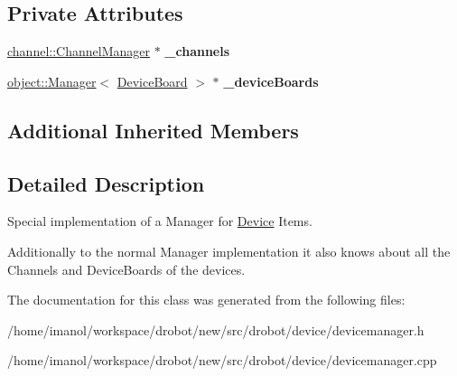 \subsection*{Private Attributes}
\begin{DoxyCompactItemize}
\item 
\hypertarget{classdrobot_1_1device_1_1DeviceManager_ae348bc4e97657d6a2222a61553e4327c}{\hyperlink{classdrobot_1_1device_1_1channel_1_1ChannelManager}{channel\-::\-Channel\-Manager} $\ast$ {\bfseries \-\_\-channels}}\label{classdrobot_1_1device_1_1DeviceManager_ae348bc4e97657d6a2222a61553e4327c}

\item 
\hypertarget{classdrobot_1_1device_1_1DeviceManager_abc4c2b56c5ae9aa5e0a906bc288b87b6}{\hyperlink{classdrobot_1_1object_1_1Manager}{object\-::\-Manager}$<$ \hyperlink{classdrobot_1_1device_1_1DeviceBoard}{Device\-Board} $>$ $\ast$ {\bfseries \-\_\-device\-Boards}}\label{classdrobot_1_1device_1_1DeviceManager_abc4c2b56c5ae9aa5e0a906bc288b87b6}

\end{DoxyCompactItemize}
\subsection*{Additional Inherited Members}


\subsection{Detailed Description}
Special implementation of a Manager for \hyperlink{classdrobot_1_1device_1_1Device}{Device} Items. 

Additionally to the normal Manager implementation it also knows about all the Channels and Device\-Boards of the devices. 

The documentation for this class was generated from the following files\-:\begin{DoxyCompactItemize}
\item 
/home/imanol/workspace/drobot/new/src/drobot/device/devicemanager.\-h\item 
/home/imanol/workspace/drobot/new/src/drobot/device/devicemanager.\-cpp\end{DoxyCompactItemize}
